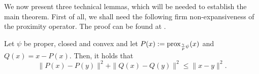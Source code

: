 \begin{itemize}
%
%
We now present three technical lemmas, which will be needed to establish the main theorem. First of all, we shall need the following firm non-expansiveness of the proximity operator. The proof can be found at \cite{xxx}.  
\begin{lemma}
Let $\psi$ be proper, closed and convex and let $P(x):= {\rm prox}_{\frac{\gamma}{p}\psi}(x)$ and $Q(x) = x - P(x)$. Then, it holds that
\begin{equation}
\|P(x) - P(y)\|^2 + \|Q(x) - Q(y)\|^2 \leq \|x - y\|^2.    
\end{equation}
\end{lemma}


\end{itemize}
